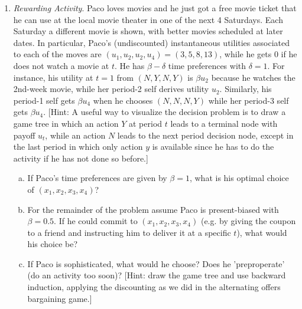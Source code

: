 \documentclass{article}
\begin{document}
\begin{enumerate}
\item \emph{Rewarding Activity}. Paco loves movies and he just got a free movie ticket that he can use at the local movie theater in one of the next 4 Saturdays.
Each Saturday a different movie is shown, with better movies scheduled at later dates. In particular, Paco's (undiscounted) instantaneous utilities associated to each of the moves are $(u_1, u_2, u_2, u_4) = (3, 5, 8, 13)$, while he gets 0 if he does not watch a movie at $t$.
He has $\beta - \delta$ time preferences with $\delta=1$.
For instance, his utility at $t = 1$ from $(N,Y,N,Y)$ is $\beta u_2$ because he watches the 2nd-week movie, while her period-2 self derives utility $u_2$.
Similarly, his period-1 self gets $\beta u_4$ when he chooses $(N,N,N,Y)$ while her period-3 self gets $\beta u_4$.
[Hint: A useful way to visualize the decision problem is to draw a game tree in which an action $Y$ at period $t$ leads to a terminal node with payoff $u_t$, while an action $N$ leads to the next period decision node, except in the last period in which only action $y$ is available since he has to do the activity if he has not done so before.]
\begin{enumerate}[(a)]
\item If Paco's time preferences are given by $\beta = 1$, what is his optimal choice of $(x_1,x_2,x_3,x_4)$?
\newline

\item For the remainder of the problem assume Paco is present-biased with $\beta = 0.5$.
If he could commit to $(x_1, x_2, x_3, x_4)$ (e.g. by giving the coupon to a friend and instructing him to deliver it at a specific $t$), what would his choice be?
\newline

\item If Paco is sophisticated, what would he choose?
Does he 'preproperate' (do an activity too soon)?
[Hint: draw the game tree and use backward induction, applying the discounting as we did in the alternating offers bargaining game.]
\newline
\end{enumerate}
\end{enumerate}
\end{document}

